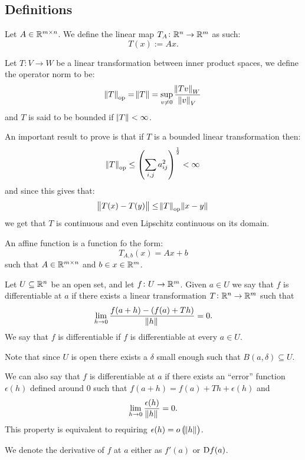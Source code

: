 \documentclass[11pt,a4paper]{article}
\begin{document}
\subsection{Definitions}
Let $A \in \mathbb{R}^{m \times n}$.
We define the linear map $T_A \colon \mathbb{R}^n \to \mathbb{R}^m$ as such:
\[
  T(x) := Ax.
\]
\begin{definition}
  Let $T \colon V \to W$ be a linear transformation between inner product
  spaces, we define the operator norm to be:
  \[
    \norm{T}_{\operatorname{op}} = \norm{T} = 
    \sup_{v \neq 0} \frac{\norm{Tv}_W}{\norm{v}_V}
  \]
  and $T$ is said to be bounded if $\norm{T} < \infty$.
\end{definition}
\begin{remark}
  An important result to prove is that if $T$ is a bounded linear 
  transformation then:
  \[
    \norm{T}_{\op} \le 
    \del{\sum_{i,j} a_{ij}^2}^{\half} < \infty
  \]
  and since this gives that:
  \[
    \norm{T(x) - T(y)} \le \norm{T}_{\operatorname{op}} \norm{x - y}
  \]
  we get that $T$ is continuous and even Lipschitz continuous on its domain.
\end{remark}
\begin{definition}
An affine function is a function fo the form:
\[
  T_{A,b}(x) = Ax + b
\]
such that $A\in\mathbb{R}^{m \times n}$ and $b\in x\in \mathbb{R}^m$.
\end{definition}
\begin{definition}
  Let $U \subseteq \mathbb{R}^n$ be an open set, and let $f \colon U \to \mathbb{R}^m$.
  Given $a \in U$ we say that $f$ is differentiable at $a$ if there exists
  a linear transformation $T \colon \mathbb{R}^n \to \mathbb{R}^m$ such that
  \[
    \lim_{h \to 0} \frac{f(a + h) - (f(a) + Th)}{\norm{h}} = 0.
  \]
  We say that $f$ is differentiable if $f$ is differentiable at every $a \in U$.
\end{definition}
\begin{remark}
  Note that since $U$ is open there exists a $\delta$ small enough such
  that $B(a,\delta) \subseteq U$.
\end{remark}
\begin{remark}
  We can also say that $f$ is differentiable at $a$ if there exists an ``error''
  function $\epsilon(h)$ defined around $0$ such that 
  $f(a + h) = f(a) + Th + \epsilon(h)$ and
  \[
    \lim_{h \to 0} \frac{\epsilon(h)}{\norm{h}} = 0.
  \]
  This property is equivalent to requiring $\epsilon(h) = o\del{\norm{h}}$.
\end{remark}
\begin{remark}
  We denote the derivative of $f$ at $a$ either as $f'(a)$ or $\Dif f(a)$.
\end{remark}
\end{document}
